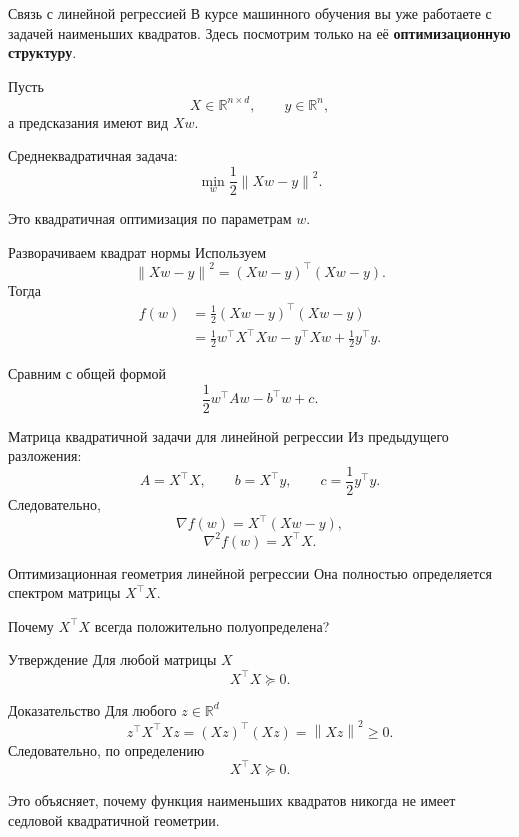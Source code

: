 \documentclass[aspectratio=169,10pt]{beamer}
\newcommand{\R}{\mathbb{R}}
\newcommand{\norm}[1]{\left\lVert #1\right\rVert}
\newcommand{\grad}{\nabla}
\newcommand{\Hess}{\nabla^2}
\begin{document}
\begin{frame}{Связь с линейной регрессией}
\small
В курсе машинного обучения вы уже работаете с задачей наименьших квадратов. Здесь посмотрим только на её \textbf{оптимизационную структуру}.

\vspace{0.5em}
Пусть
\[
 X\in\R^{n\times d},\qquad y\in\R^n,
\]
а предсказания имеют вид $Xw$.

Среднеквадратичная задача:
\[
 \boxed{
 \min_w\frac12\norm{Xw-y}^2.
 }
\]

Это квадратичная оптимизация по параметрам $w$.
\end{frame}

\begin{frame}{Разворачиваем квадрат нормы}
\small
Используем
\[
 \norm{Xw-y}^2=(Xw-y)^\top(Xw-y).
\]
Тогда
\[
\begin{aligned}
f(w)
&=\frac12(Xw-y)^\top(Xw-y)\\
&=\frac12w^\top X^\top Xw-y^\top Xw+\frac12y^\top y.
\end{aligned}
\]

\begin{block}{Сравним с общей формой}
\[
 \frac12w^\top Aw-b^\top w+c.
\]
\end{block}
\end{frame}

\begin{frame}{Матрица квадратичной задачи для линейной регрессии}
\vspace{0.65em}
Из предыдущего разложения:
\[
 \boxed{A=X^\top X,}
 \qquad
 \boxed{b=X^\top y,}
 \qquad
 \boxed{c=\frac12y^\top y.}
\]
Следовательно,
\[
 \boxed{\grad f(w)=X^\top(Xw-y),}
\]
\[
 \boxed{\Hess f(w)=X^\top X.}
\]

\begin{alertblock}{Оптимизационная геометрия линейной регрессии}
Она полностью определяется спектром матрицы $X^\top X$.
\end{alertblock}
\end{frame}

\begin{frame}{Почему $X^\top X$ всегда положительно полуопределена?}
\small
\begin{block}{Утверждение}
Для любой матрицы $X$
\[
 X^\top X\succeq0.
\]
\end{block}

\begin{block}{Доказательство}
Для любого $z\in\R^d$
\[
 z^\top X^\top Xz=(Xz)^\top(Xz)=\norm{Xz}^2\ge0.
\]
Следовательно, по определению
\[
 \boxed{X^\top X\succeq0.}
\]
\end{block}

Это объясняет, почему функция наименьших квадратов никогда не имеет седловой квадратичной геометрии.
\end{frame}
\end{document}
